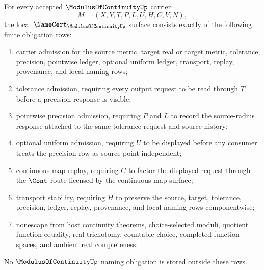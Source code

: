 \begin{theorem}
\label{thm:modulus-of-continuity-namecert-obligations}
For every accepted $\ModulusOfContinuityUp$ carrier
$$
M=(X,Y,T,P,L,U,H,C,V,N),
$$
the local $\NameCert_{\ModulusOfContinuityUp}$ surface consists exactly of the following finite obligation rows:
\begin{enumerate}
\item carrier admission for the source metric, target real or target metric, tolerance, precision, pointwise ledger, optional uniform ledger, transport, replay, provenance, and local naming rows;
\item tolerance admission, requiring every output request to be read through $T$ before a precision response is visible;
\item pointwise precision admission, requiring $P$ and $L$ to record the source-radius response attached to the same tolerance request and source history;
\item optional uniform admission, requiring $U$ to be displayed before any consumer treats the precision row as source-point independent;
\item continuous-map replay, requiring $C$ to factor the displayed request through the $\Cont$ route licensed by the continuous-map surface;
\item transport stability, requiring $H$ to preserve the source, target, tolerance, precision, ledger, replay, provenance, and local naming rows componentwise;
\item nonescape from host continuity theorems, choice-selected moduli, quotient function equality, real trichotomy, countable choice, completed function spaces, and ambient real completeness.
\end{enumerate}
No $\ModulusOfContinuityUp$ naming obligation is stored outside these rows.
\end{theorem}
